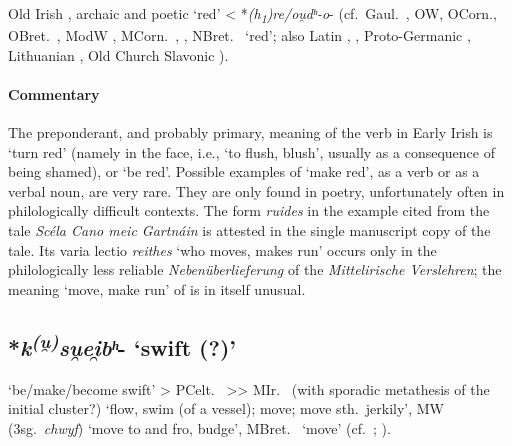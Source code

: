 \documentclass[output=paper,colorlinks,citecolor=brown]{langscibook}
\begin{document}
Old Irish  , archaic and poetic  ‘red’ < \mbox{*\textit{(h\textsubscript{1})re/ou̯dʰ-o}-}  (cf.\ Gaul.\ , OW, OCorn., OBret.\ , ModW , MCorn.\ , , NBret.\  ‘red’; also Latin , , Proto-Germanic , Lithuanian , Old Church Slavonic ).

\paragraph*{Commentary}

The preponderant, and probably primary, meaning of the verb in Early Irish is  ‘turn red’ (namely in the face, i.e., ‘to flush, blush’, usually as a consequence of being shamed), or  ‘be red’. Possible examples of  ‘make red’, as a verb or as a verbal noun, are very rare. They are only found in poetry, unfortunately often in philologically difficult contexts. The form \textit{ruides}  in the example cited from the tale \textit{Scéla Cano meic Gartnáin} is attested in the single manuscript copy of the tale. Its varia lectio \textit{reithes}  ‘who moves, makes run’ occurs only in the philo\-logi\-cally less reliable \textit{Nebenüberlieferung} of the \textit{Mittelirische Verslehren}; the  meaning ‘move, make run’ of  is in itself unusual.

\subsection{*\textit{k\textsuperscript{(u̯)}su̯ei̯bʰ}- ‘swift (?)’}
\label{sec:stativeswift}

 ‘be/make/become swift' > PCelt.\  >{>} MIr.\  (with sporadic metathesis of the initial cluster?) ‘flow, swim (of a vessel); move; move sth.\ jerkily’, MW  (3sg.\ \textit{chwyf}) ‘move to and fro, budge’, MBret.\  ‘move’ (cf.\ \citealt{Schrijver2003}; \citealt[422--424]{Schumacher2004}). 
\end{document}
